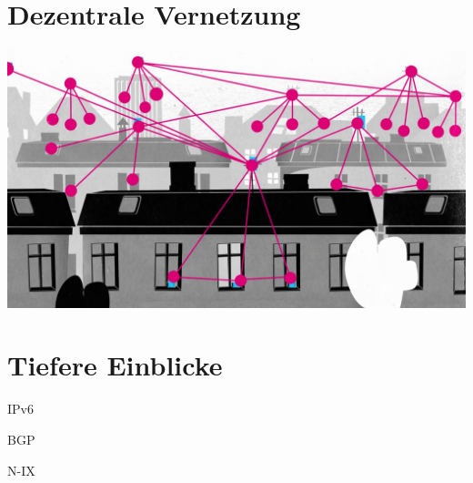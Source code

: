 \documentclass{beamer}
\begin{document}
	\section{Dezentrale Vernetzung}
	\begin{frame}
		\includegraphics[width=\framewidth]{media/dachzudach.png}
	\end{frame}
	\section{Tiefere Einblicke}
	\begin{frame}{IPv6}
	\end{frame}

	\begin{frame}{BGP}
	\end{frame}

	\begin{frame}{N-IX}
	\end{frame}
\end{document}
